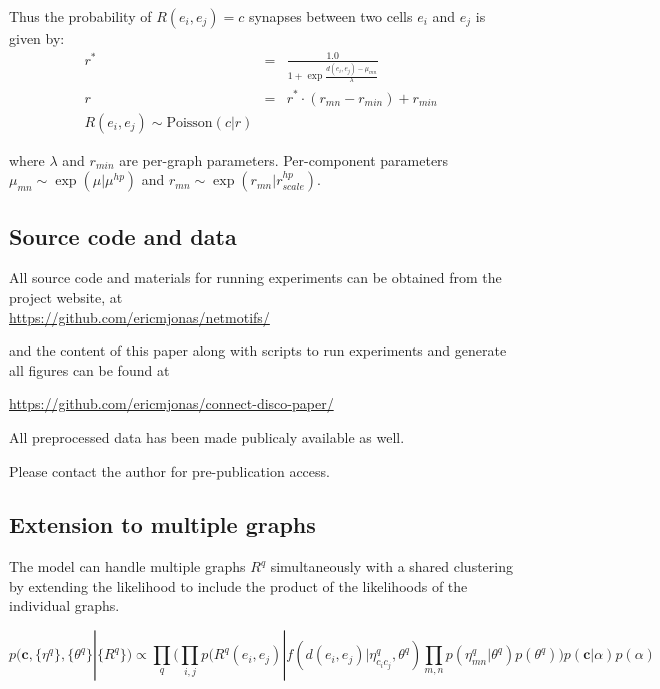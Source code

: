 \documentclass{article}
\renewcommand{\vec}[1]{\mathbf{#1}}
\begin{document}
Thus the probability of $R(e_i, e_j) = c$ synapses between two cells $e_i$ and $e_j$ is given by:
\begin{eqnarray}
r^* &=& \frac{1.0}{1 + \exp \frac{d(e_i, e_j) - \mu_{mn}}{\lambda}}\\
r & = & r^* \cdot (r_{mn} - r_{min}) + r_{min} \\
R(e_i, e_j) \sim \textrm{Poisson}(c | r)
\end{eqnarray}

where $\lambda$ and $r_{min}$ are per-graph parameters. Per-component parameters $\mu_{mn} \sim \exp(\mu | \mu^{hp})$ and $r_{mn} \sim \exp(r_{mn} | r_{scale}^{hp})$. 

\subsection*{Source code and data}

All source code and materials for running experiments can be
obtained from the project website, at \\

\href{http://https://github.com/ericmjonas/netmotifs}{https://github.com/ericmjonas/netmotifs/}

and the content of this paper along with scripts to run
experiments and generate all figures can be found at

\href{http://https://github.com/ericmjonas/netmotifs}{https://github.com/ericmjonas/connect-disco-paper/}

All preprocessed data has been made publicaly available as well. 

Please contact the author for pre-publication access. 

\subsection*{Extension to multiple graphs}
\label{supp:multigraph}
The model can handle multiple graphs $R^q$ simultaneously with a shared clustering by extending the likelihood to include the product of the likelihoods of the individual graphs. 

\begin{equation}
  p(\vec{c}, \{\eta^q\}, \{\theta^q\} | \{R^q\} ) \propto \prod_q \Bigg(\prod_{i, j} p(R^q(e_i, e_j) | f(d(e_i, e_j) | \eta^q_{c_ic_j}, \theta^q) \prod_{m, n} p(\eta^q_{mn} | \theta^q)  p(\theta^q) \Bigg) p(\vec{c} | \alpha) p(\alpha) 
\end{equation}

\FloatBarrier
\end{document}
